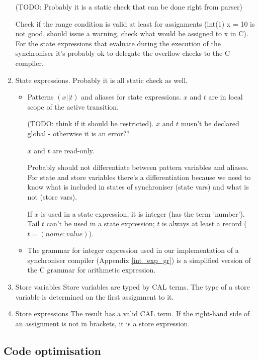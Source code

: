 \begin{enumerate}
(TODO: Probably it is a static check that can be done right from parser)

Check if the range condition is valid at least for assignments (int(1) x = 10 is not good, should issue a warning, check what would be assigned to x in C). For the state expressions that evaluate during the execution of the synchroniser it's probably ok to delegate the overflow checks to the C compiler.

\item State expressions. Probably it is all static check as well.
  \begin{itemize}
  \item Patterns $(x || t)$ and aliases for state expressions. $x$ and $t$ are in local scope of the active transition.

(TODO: think if it should be restricted). $x$ and $t$ musn't be declared global - otherwise it is an error??

$x$ and $t$ are read-only.

Probably should not differentiate between pattern variables and aliases. For state and store variables there's a differentiation because we need to know what is included in states of synchroniser (state vars) and what is not (store vars).

If $x$ is used in a state expression, it is integer (has the term 'number'). Tail $t$ can't be used in a state expression; $t$ is always at least a record ($t = (name: value)$).

  \item The grammar for integer expression used in our implementation of a synchroniser compiler (Appendix \ref{int_exp_gr}) is a simplified version of the C grammar for arithmetic expression.

  \end{itemize}


\item Store variables
Store variables are typed by CAL terms.
The type of a store variable is determined on the first assignment to it.

\item Store expressions
The result has a valid CAL term.
If the right-hand side of an assignment is not in brackets, it is a store expression.

\end{enumerate}


\subsection{Code optimisation}
